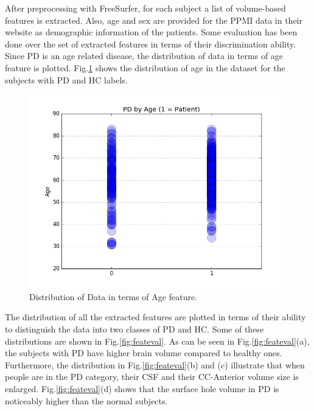 \documentclass[runningheads,a4paper]{llncs}
\begin{document}
After preprocessing with FreeSurfer, for each subject a list of volume-based features is extracted. Also, age and sex are provided for the PPMI data in their website as demographic information of the patients. Some evaluation has been done over the set of extracted features in terms of their discrimination ability. Since PD is an age related disease, the distribution of data in terms of age feature is plotted. Fig.\ref{fig:agelabel} shows the distribution of age in the dataset for the subjects with PD and HC labels.
\begin{figure}[h]\small
\centering
\includegraphics[scale=0.4]{AgeData.png}
\caption{Distribution of Data in terms of Age feature.}
\label{fig:agelabel}
\end{figure}
The distribution of all the extracted features are plotted in terms of their ability to distinguish the data into two classes of PD and HC. Some of these distributions are shown in Fig.\ref{fig:feateval}. As can be seen in Fig.\ref{fig:feateval}(a), the subjects with PD have higher brain volume compared to healthy ones. Furthermore, the distribution in Fig.\ref{fig:feateval}(b) and (c) illustrate that when people are in the PD category, their CSF and their CC-Anterior  volume size is enlarged. Fig.\ref{fig:feateval}(d) shows that the surface hole volume in PD is noticeably higher than the normal subjects.
\end{document}
